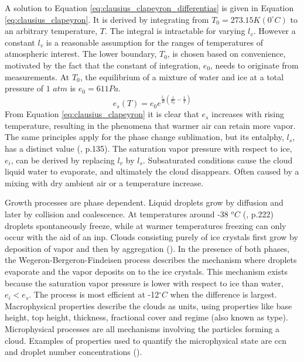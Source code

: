 A solution to Equation \eqref{eq:clausius_clapeyron_differentias} is given in Equation \eqref{eq:clausius_clapeyron}. It is derived by integrating from $T_0 = 273.15K \left(0 ^{\circ}C \right)$ to an arbitrary temperature, $T$. The integral is intractable for varying $l_v$. However a constant $l_v$ is %
a reasonable assumption for the ranges of temperatures of atmospheric interest. The lower boundary, $T_0$, is chosen based on convenience, motivated by the fact that the constant of integration,  $e_0$, needs to originate from measurements. At $T_0$, the equilibrium of a mixture of water and ice at a total pressure of $1$ $atm$ is $e_0 = 611Pa$. 
\begin{equation} \label{eq:clausius_clapeyron}
    e_s\left( T \right) = e_0 e^{\frac{l_v}{R} \left( \frac{1}{T_0} - \frac{1}{T} \right) }
\end{equation}
From Equation \eqref{eq:clausius_clapeyron} it is clear that $e_s$ increases with rising temperature, resulting in the phenomena that warmer air can retain more vapor. The same principles apply for the phase change sublimation, but its entalphy, $l_s$, has a distinct value (\cite{cloud_phys_book_johanne}, p.135). The saturation vapor pressure with respect to ice, $e_i$, can be derived by replacing $l_v$ by $l_s$. Subsaturated conditions cause the cloud liquid water to evaporate, and ultimately the cloud disappears. Often caused by a mixing with dry ambient air or a temperature increase.%

Growth processes are phase dependent. Liquid droplets grow by diffusion and later by collision and coalescence. At temperatures around -38 $^oC$ (\cite{lohmann2016}, p.222) droplets spontaneously freeze, while at warmer temperatures freezing can only occur with the aid of an  \acrshort{inp}. Clouds consisting purely of ice crystals first grow by deposition of vapor and then by aggregation (\cite{Fowler1996LiquidAssumptions}). In the presence of both phases, the Wegeron-Bergeron-Findeisen %
process describes the mechanism where droplets evaporate and the vapor deposits on to the ice crystals. %
This mechanism exists because the saturation vapor pressure is lower with respect to ice than water, $e_i < e_s$. The process is most efficient at -12$^{\circ}C$ when the difference is largest. Macrophysical properties describe the clouds as units, using properties like base height, top height, thickness, fractional cover and regime (also known as type). Microphysical processes are all mechanisms involving the particles forming a cloud. Examples of properties used to quantify the microphysical state
are \acrshort{ccn} and droplet number concentrations (\cite{Grabowski2019ModelingBetter}).

